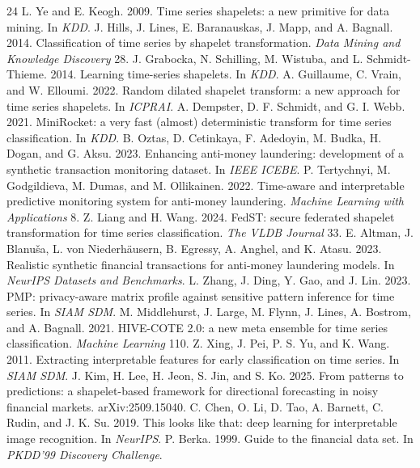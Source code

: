\documentclass[sigconf,anonymous]{acmart}
\begin{document}

\begin{thebibliography}{24}
 L. Ye and E. Keogh. 2009. Time series shapelets: a new primitive for data mining. In \emph{KDD}.
 J. Hills, J. Lines, E. Baranauskas, J. Mapp, and A. Bagnall. 2014. Classification of time series by shapelet transformation. \emph{Data Mining and Knowledge Discovery} 28.
 J. Grabocka, N. Schilling, M. Wistuba, and L. Schmidt-Thieme. 2014. Learning time-series shapelets. In \emph{KDD}.
 A. Guillaume, C. Vrain, and W. Elloumi. 2022. Random dilated shapelet transform: a new approach for time series shapelets. In \emph{ICPRAI}.
 A. Dempster, D. F. Schmidt, and G. I. Webb. 2021. MiniRocket: a very fast (almost) deterministic transform for time series classification. In \emph{KDD}.
 B. Oztas, D. Cetinkaya, F. Adedoyin, M. Budka, H. Dogan, and G. Aksu. 2023. Enhancing anti-money laundering: development of a synthetic transaction monitoring dataset. In \emph{IEEE ICEBE}.
 P. Tertychnyi, M. Godgildieva, M. Dumas, and M. Ollikainen. 2022. Time-aware and interpretable predictive monitoring system for anti-money laundering. \emph{Machine Learning with Applications} 8.
 Z. Liang and H. Wang. 2024. FedST: secure federated shapelet transformation for time series classification. \emph{The VLDB Journal} 33.
 E. Altman, J. Blanu\v{s}a, L. von Niederh\"ausern, B. Egressy, A. Anghel, and K. Atasu. 2023. Realistic synthetic financial transactions for anti-money laundering models. In \emph{NeurIPS Datasets and Benchmarks}.
 L. Zhang, J. Ding, Y. Gao, and J. Lin. 2023. PMP: privacy-aware matrix profile against sensitive pattern inference for time series. In \emph{SIAM SDM}.
 M. Middlehurst, J. Large, M. Flynn, J. Lines, A. Bostrom, and A. Bagnall. 2021. HIVE-COTE 2.0: a new meta ensemble for time series classification. \emph{Machine Learning} 110.
 Z. Xing, J. Pei, P. S. Yu, and K. Wang. 2011. Extracting interpretable features for early classification on time series. In \emph{SIAM SDM}.
 J. Kim, H. Lee, H. Jeon, S. Jin, and S. Ko. 2025. From patterns to predictions: a shapelet-based framework for directional forecasting in noisy financial markets. arXiv:2509.15040.
 C. Chen, O. Li, D. Tao, A. Barnett, C. Rudin, and J. K. Su. 2019. This looks like that: deep learning for interpretable image recognition. In \emph{NeurIPS}.
 P. Berka. 1999. Guide to the financial data set. In \emph{PKDD'99 Discovery Challenge}.

\end{thebibliography}
\end{document}
